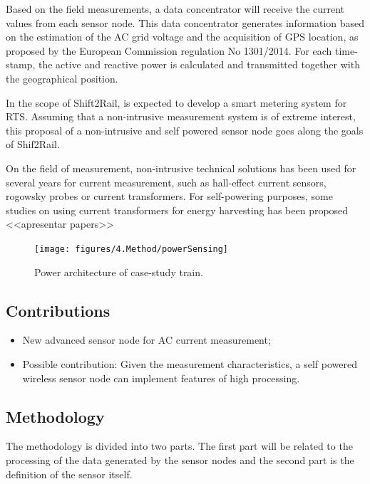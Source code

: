 Based on the field measurements, a data concentrator will receive the current values from each sensor node. This data concentrator generates information based on the estimation of the AC grid voltage and the acquisition of GPS location, as proposed by the European Commission regulation No 1301/2014. For each time-stamp, the active and reactive power is calculated and transmitted together with the geographical position.

In the scope of Shift2Rail, is expected to develop a smart metering system for RTS. Assuming that a non-intrusive measurement system is of extreme interest, this proposal of a non-intrusive and self powered sensor node goes along the goals of Shif2Rail.

On the field of measurement, non-intrusive technical solutions has been used for several years for current measurement, such as hall-effect current sensors, rogowsky probes or current transformers.
For self-powering purposes, some studies on using current transformers for energy harvesting has been proposed <<apresentar papers>>


\begin{figure}[h!]
	\centering
	\vspace{-1em}
	\texttt{[image: figures/4.Method/powerSensing]}
	\caption{Power architecture of case-study train.}
	\label{fig:4.powerSensing}
\end{figure}



\subsection{Contributions}

\begin{itemize}
	\setlength\itemsep{0em}
	\item New advanced sensor node for AC current measurement;

	\item Possible contribution: Given the measurement characteristics, a self powered wireless sensor node can implement features of high processing.
\end{itemize}


\subsection{Methodology}

The methodology is divided into two parts. The first part will be related to the processing of the data generated by the sensor nodes and the second part is the definition of the sensor itself.

